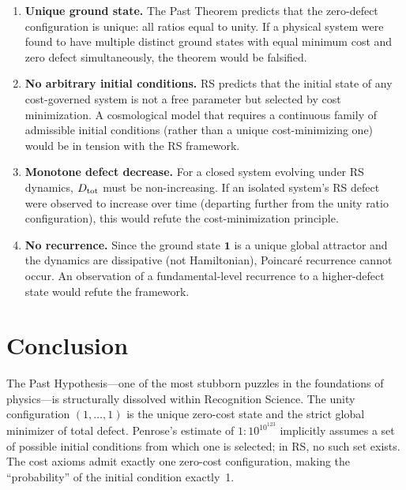 \documentclass[12pt,a4paper]{article}
\theoremstyle{definition}
\theoremstyle{remark}
\begin{document}
\begin{enumerate}
  \item \textbf{Unique ground state.}  The Past Theorem predicts that the
  zero-defect configuration is unique: all ratios equal to unity.  If
  a physical system were found to have multiple distinct ground states
  with equal minimum cost and zero defect simultaneously, the theorem
  would be falsified.

  \item \textbf{No arbitrary initial conditions.}  RS predicts that the
  initial state of any cost-governed system is not a free parameter but
  selected by cost minimization.  A cosmological model that requires a
  continuous family of admissible initial conditions (rather than a
  unique cost-minimizing one) would be in tension with the RS framework.

  \item \textbf{Monotone defect decrease.}  For a closed system evolving
  under RS dynamics, $D_{\rm tot}$ must be non-increasing.  If an
  isolated system's RS defect were observed to increase over time
  (departing further from the unity ratio configuration), this would
  refute the cost-minimization principle.

  \item \textbf{No recurrence.}  Since the ground state $\mathbf{1}$
  is a unique global attractor and the dynamics are dissipative (not
  Hamiltonian), Poincar\'e recurrence cannot occur.  An observation of
  a fundamental-level recurrence to a higher-defect state would refute
  the framework.
\end{enumerate}

\section{Conclusion}
\label{sec:conclusion}

The Past Hypothesis---one of the most stubborn puzzles in the foundations
of physics---is structurally dissolved within Recognition Science.  The
unity configuration $(1, \ldots, 1)$ is the unique zero-cost state and
the strict global minimizer of total defect.  Penrose's estimate of
$1:10^{10^{123}}$ implicitly assumes a set of possible initial conditions
from which one is selected; in RS, no such set exists.  The cost axioms
admit exactly one zero-cost configuration, making the ``probability'' of
the initial condition exactly~1.
\end{document}

